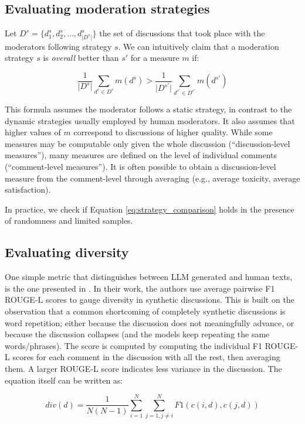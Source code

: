\subsection{Evaluating moderation strategies}
\label{ssec:methodology:strategies}

Let $D^{s} = \{d^s_1, d^s_2, \ldots, d^s_{\lvert D^s \rvert}\}$  the set of discussions that took place with the moderators following strategy $s$. We can intuitively claim that a moderation strategy $s$ is \textit{overall} better than $s'$ for a measure $m$ if:

\begin{equation}
\label{eq:strategy_comparison}
    \frac{1}{\lvert D^{s} \rvert} {\sum_{d^{s} \in D^{s}} m(d^{s})} > \frac{1}{\lvert D^{s'} \rvert} {\sum_{d^{s'} \in D^{s'}} m(d^{s'})}
\end{equation}

This formula assumes the moderator follows a static strategy, in contrast to the dynamic strategies usually employed by human moderators. It also assumes that higher values of $m$ correspond to discussions of higher quality. While some measures may be computable only given the whole discussion (“discussion-level measures”), many measures are defined on the level of individual comments (“comment-level measures”). It is often possible to obtain a discussion-level measure from the comment-level through averaging (e.g., average toxicity, average satisfaction).

In practice, we check if Equation \ref{eq:strategy_comparison} holds in the presence of randomness and limited samples.


\subsection{Evaluating diversity}
\label{ssec:methodology:diversity}

One simple metric that distinguishes between LLM generated and human texts, is the one presented in \citet{ulmer2024}. In their work, the authors use average pairwise F1 ROUGE-L scores \cite{lin-2004-rouge} to gauge diversity in synthetic discussions. This is built on the observation that a common shortcoming of completely synthetic discussions is word repetition; either because the discussion does not meaningfully advance, or because the discussion collapses (and the models keep repeating the same words/phrases). The score is computed by computing the individual F1 ROUGE-L scores for each comment in the discussion with all the rest, then averaging them. A larger ROUGE-L score indicates less variance in the discussion. The equation itself can be written as:

\small
\begin{equation}
\label{eq:variety}
    div(d) = \frac{1}{N(N-1)} \sum_{i=1}^N \sum_{j=1, j \neq i}^N F1(c(i, d), c(j, d))
\end{equation}
\normalsize